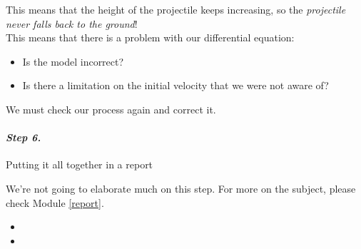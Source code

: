 \begin{example}
This means that the height of the projectile keeps increasing, so the \emph{projectile never falls back to the ground}! \\

This means that there is a problem with our differential equation:
\begin{itemize}
	\item Is the model incorrect? 
	\item Is there a limitation on the initial velocity that we were not aware of?
\end{itemize}
\hfil

We must check our process again and correct it.
\end{example}




\paragraph{\emph{Step 6.}} Putting it all together in a report

We're not going to elaborate much on this step. For more on the subject, please check Module \ref{report}.





\begin{video}
\begin{itemize}
	\item {}
	\item {}
\end{itemize}	
\end{video}

